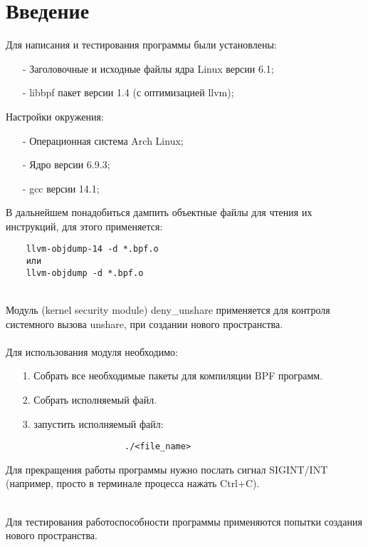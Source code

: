 \chapter{Введение}
\label{intro:0}
\begin{flushleft}

Для написания и тестирования программы были установлены:

\begin{itemize}
	\item[-] Заголовочные и исходные файлы ядра Linux версии 6.1;
	\item[-] libbpf пакет версии 1.4 (с оптимизацией llvm);
\end{itemize}
Настройки окружения:
\begin{itemize}
	\item[-] Операционная система Arch Linux;
	\item[-] Ядро версии 6.9.3;
	\item[-] gcc версии 14.1;
\end{itemize}


В дальнейшем понадобиться дампить объектные файлы для чтения их инструкций, для этого применяется:
\begin{verbatim}
	llvm-objdump-14 -d *.bpf.o
	или
	llvm-objdump -d *.bpf.o
\end{verbatim}

\ \\
Модуль (kernel security module) deny\_unshare применяется для контроля системного вызова unshare, при создании нового пространства.\\

\ \\
Для использования модуля необходимо:
\begin{itemize}
	\item[1.] Собрать все необходимые пакеты для компиляции BPF программ.
	\item[2.] Собрать исполняемый файл.
	\item[3.] запустить исполняемый файл:
	\begin{verbatim}
					./<file_name>
	\end{verbatim}
\end{itemize}


Для прекращения работы программы нужно послать сигнал SIGINT/INT (например, просто в терминале процесса нажать Ctrl+C).
\\ \

Для тестирования работоспособности программы применяются попытки создания нового пространства.
\end{flushleft}

